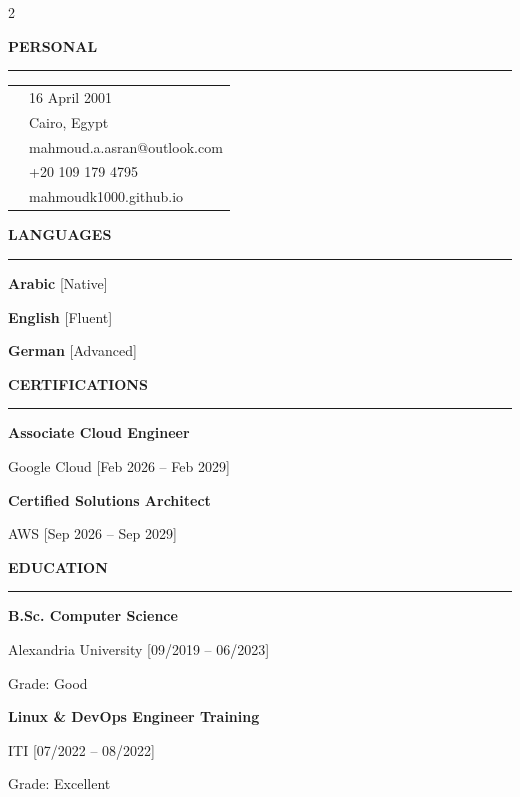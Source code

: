 \documentclass[9pt, a4paper]{extarticle}
\newcommand{\cvsectionleft}[1]{
    \vspace{3ex}
    {\large\bfseries\textcolor{textwhite}{\uppercase{#1}}}\par\vspace{0.5ex}
    \textcolor{textwhite}{\rule{3cm}{1pt}}\par\vspace{1.5ex}
    \color{textlight}
}
\begin{document}
\begin{paracol}{2}

	\raggedright

	\cvsectionleft{Personal}
	\begin{tabularx}{\linewidth}{@{}p{0.5cm} X@{}}
		\textcolor{textlight}{\faCalendar}  & \small 16 April 2001               \\
		\textcolor{textlight}{\faMapMarker} & \small Cairo, Egypt                \\
		\textcolor{textlight}{\faEnvelope}  & \small mahmoud.a.asran@outlook.com \\
		\textcolor{textlight}{\faPhone}     & \small +20 109 179 4795            \\
		\textcolor{textlight}{\faGlobe}     & \small mahmoudk1000.github.io      \\
	\end{tabularx}

	\cvsectionleft{Languages}
	\textbf{\textcolor{textwhite}{Arabic}} {\small [Native]}\par\vspace{1ex}
	\textbf{\textcolor{textwhite}{English}} {\small [Fluent]}\par\vspace{1ex}
	\textbf{\textcolor{textwhite}{German}} {\small [Advanced]}

	\cvsectionleft{Certifications}
	{\small
		\textbf{\textcolor{textwhite}{Associate Cloud Engineer}}\par
		Google Cloud [Feb 2026 -- Feb 2029]\par\vspace{1.5ex}
		\textbf{\textcolor{textwhite}{Certified Solutions Architect}}\par
		AWS [Sep 2026 -- Sep 2029]
	}

	\cvsectionleft{Education}
	{\small
		\textbf{\textcolor{textwhite}{B.Sc. Computer Science}}\par
		Alexandria University [09/2019 -- 06/2023]\par\vspace{0.5ex}
		Grade: Good\par\vspace{1.5ex}
		\textbf{\textcolor{textwhite}{Linux \& DevOps Engineer Training}}\par
		ITI [07/2022 -- 08/2022]\par\vspace{0.5ex}
		Grade: Excellent
	}


\end{paracol}
\end{document}
